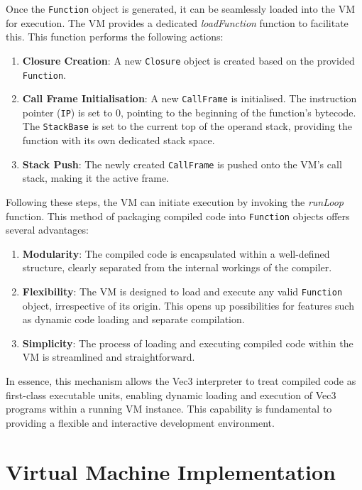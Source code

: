 Once the \texttt{Function} object is generated, it can be seamlessly loaded into the VM for execution.
The VM provides a dedicated \textit{loadFunction} function to facilitate this.
This function performs the following actions:

\begin{enumerate}
    \item \textbf{Closure Creation}: A new \texttt{Closure} object is created based on the provided \texttt{Function}.
    \item \textbf{Call Frame Initialisation}: A new \texttt{CallFrame} is initialised.
    The instruction pointer (\texttt{IP}) is set to 0, pointing to the beginning of the function's bytecode.
    The \texttt{StackBase} is set to the current top of the operand stack, providing the function with its own dedicated stack space.
    \item \textbf{Stack Push}: The newly created \texttt{CallFrame} is pushed onto the VM's call stack, making it the active frame.
\end{enumerate}

Following these steps, the VM can initiate execution by invoking the \textit{runLoop} function.
This method of packaging compiled code into \texttt{Function} objects offers several advantages:

\begin{enumerate}
    \item \textbf{Modularity}: The compiled code is encapsulated within a well-defined structure, clearly separated from the internal workings of the compiler.
    \item \textbf{Flexibility}: The VM is designed to load and execute any valid \texttt{Function} object, irrespective of its origin.
    This opens up possibilities for features such as dynamic code loading and separate compilation.
    \item \textbf{Simplicity}: The process of loading and executing compiled code within the VM is streamlined and straightforward.
\end{enumerate}
In essence, this mechanism allows the Vec3 interpreter to treat compiled code as first-class executable units, enabling dynamic loading and execution of Vec3 programs within a running VM instance.
This capability is fundamental to providing a flexible and interactive development environment.

\section{Virtual Machine Implementation}
\label{sec:virtual-machine}


